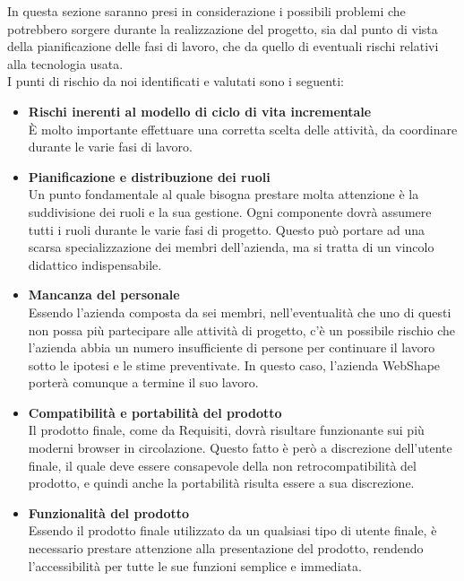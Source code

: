 In questa sezione saranno presi in considerazione i possibili problemi che potrebbero sorgere durante la realizzazione del progetto, sia dal punto di vista della pianificazione delle fasi di lavoro, che da quello di eventuali rischi relativi alla tecnologia usata.\\
I punti di rischio da noi identificati e valutati sono i seguenti:\\
\begin{itemize}
\item \textbf{Rischi inerenti al modello di ciclo di vita incrementale}\\
\`E molto importante effettuare una corretta scelta delle attivit\`a, da coordinare durante le varie fasi di lavoro.
\item \textbf{Pianificazione e distribuzione dei ruoli}\\
Un punto fondamentale al quale bisogna prestare molta attenzione \`e la suddivisione dei ruoli e la sua gestione. Ogni componente dovr\`a assumere tutti i ruoli durante le varie fasi di progetto. Questo pu\`o portare ad una scarsa specializzazione dei membri dell'azienda, ma si tratta di un vincolo didattico indispensabile.
\item \textbf{Mancanza del personale}\\
Essendo l'azienda composta da sei membri, nell'eventualit\`a che uno di questi non possa pi\`u partecipare alle attivit\`a di progetto, c'\`e un possibile rischio che l'azienda abbia un numero insufficiente di persone per continuare il lavoro sotto le ipotesi e le stime preventivate. In questo caso, l'azienda WebShape porter\`a comunque a termine il suo lavoro.
\item \textbf{Compatibilit\`a e portabilit\`a del prodotto}\\
Il prodotto finale, come da Requisiti, dovr\`a risultare funzionante sui pi\`u moderni browser in circolazione. Questo fatto \`e per\`o  a discrezione dell'utente finale, il quale deve essere consapevole della non retrocompatibilit\`a del prodotto, e quindi anche la portabilit\`a risulta essere  a sua discrezione.
\item \textbf{Funzionalit\`a del prodotto}\\
Essendo il prodotto finale utilizzato da un qualsiasi tipo di utente finale, \`e necessario prestare attenzione alla presentazione del prodotto, rendendo l'accessibilit\`a per tutte le sue funzioni semplice e immediata.
\end{itemize}			


